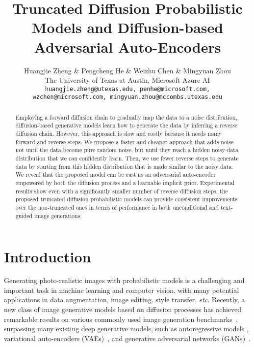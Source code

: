 \documentclass{article} \usepackage{iclr2023_conference,times}
\title{Truncated Diffusion Probabilistic Models and Diffusion-based Adversarial Auto-Encoders}
\author{Huangjie Zheng \& Pengcheng He \& Weizhu Chen \& Mingyuan Zhou \\
The University of Texas at Austin, Microsoft Azure AI\\
\texttt{huangjie.zheng@utexas.edu, penhe@microsoft.com,}\\\texttt{wzchen@microsoft.com, mingyuan.zhou@mccombs.utexas.edu} \\
}
\theoremstyle{plain}
\theoremstyle{definition}
\theoremstyle{remark}
\begin{document}
\maketitle

\begin{abstract}
Employing a forward diffusion chain to gradually map the data to a  noise distribution, diffusion-based generative models learn how to generate the data by inferring a reverse diffusion chain.
However, this approach is slow and costly because it needs many forward and reverse steps. We propose a faster and cheaper approach that adds noise not until the data become pure random noise, but until they reach a hidden noisy-data distribution that we can confidently learn. Then, we use fewer reverse steps to generate data by starting from this hidden distribution that is made similar to the noisy data. We reveal that the proposed model can be cast as an adversarial auto-encoder empowered by both the diffusion process and a learnable implicit prior. Experimental results show even with a significantly smaller number of reverse diffusion steps, the proposed truncated diffusion probabilistic models can provide consistent improvements over the non-truncated ones in terms of performance in both unconditional and text-guided image generations. 










\end{abstract}

\section{Introduction}\label{sec:intro}

Generating photo-realistic images with  probabilistic models is a challenging and important task in machine learning and computer vision, with many potential applications in data augmentation, image editing, style transfer, \textit{etc}.
Recently, a new class of image generative models based on diffusion processes \citep{diffusion} has achieved remarkable results on various 
commonly used image generation benchmarks~\citep{scorematching,ddpm,improvedscore,song2021scorebased,Dhariwal2021DiffusionMB}, surpassing many existing deep generative models, such as autoregressive models \citep{pixelcnn}, variational auto-encoders (VAEs)~\citep{kingma2013auto,rezende2014stochastic,van2017neural,razavi2019generating}, and generative adversarial networks (GANs)~\citep{goodfellow2014generative,radford2015unsupervised,arjovsky2017wasserstein,miyato2018spectral,brock2018large,karras2019style,karras2020analyzing}. 
\end{document}
